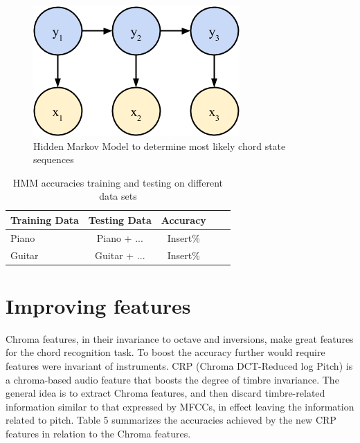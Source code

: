 \documentclass{article}
\begin{document}
\begin{figure}[ht]
\vskip 0.2in
\begin{center}
\centerline{\includegraphics[width=\columnwidth]{hmm}}
\caption{Hidden Markov Model to determine most likely chord state sequences}
\label{icml-historical}
\end{center}
\vskip -0.2in
\end{figure}

\begin{table}[t]
\caption{HMM accuracies training and testing on different data sets}
\label{hmmacc}
\vskip 0.15in
\begin{center}
\begin{small}
\begin{sc}
\begin{tabular}{lcccr}
\hline
\abovespace\belowspace
Training Data & Testing Data & Accuracy \\
\hline
\abovespace
Piano  & Piano + ... & Insert\%\\
Guitar & Guitar + ... & Insert\%\\
\hline
\end{tabular}
\end{sc}
\end{small}
\end{center}
\vskip -0.1in
\end{table}

\section{Improving features}

Chroma features, in their invariance to octave and inversions, make great features for the chord recognition task. To boost the accuracy further would require features were invariant of instruments. CRP (Chroma DCT-Reduced log Pitch) is a chroma-based audio feature that boosts the degree of timbre invariance. The general idea is to extract Chroma features, and then discard timbre-related information similar to that expressed by MFCCs, in effect leaving the information related to pitch. Table 5 summarizes the accuracies achieved by the new CRP features in relation to the Chroma features.
\end{document}
